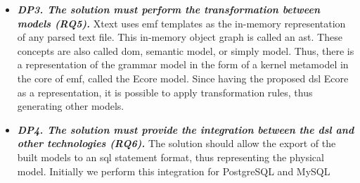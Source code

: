 \begin{itemize}
    \item\textit{\textbf{DP3. The solution must perform the transformation between models (RQ5).}}
    Xtext uses \ac{emf} templates as the in-memory representation of any parsed text file.
    This in-memory object graph is called an \ac{ast}.
    These concepts are also called \ac{dom}, semantic model, or simply model.
    Thus, there is a representation of the grammar model in the form of a kernel metamodel in the core of \ac{emf}, called the Ecore model.
    Since having the proposed \ac{dsl} Ecore as a representation, it is possible to apply transformation rules, thus generating other models.
    
    \item\textit{\textbf{DP4. The solution must provide the integration between the \ac{dsl} and other technologies (RQ6).}}
    The solution should allow the export of the built models to an \ac{sql} statement format, thus representing the physical model.
    Initially we perform this integration for PostgreSQL and MySQL
    

\end{itemize}
